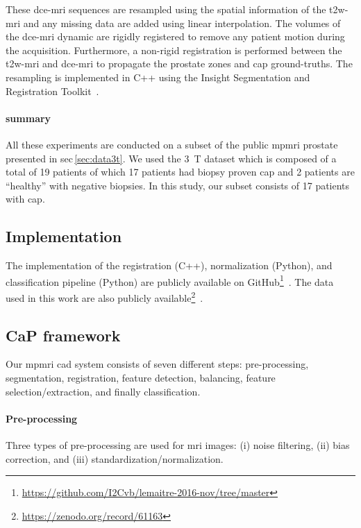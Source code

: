 \documentclass[num-refs]{wiley-article}
\begin{document}
These \ac{dce}-\ac{mri} sequences are resampled using the spatial
information of the \ac{t2w}-\ac{mri} and any missing data are added using linear interpolation.
The volumes of the \ac{dce}-\ac{mri} dynamic are rigidly registered to remove any patient motion during the acquisition.
Furthermore, a non-rigid registration is performed between the \ac{t2w}-\ac{mri} and \ac{dce}-\ac{mri} to propagate the prostate zones and \ac{cap} ground-truths.
The resampling is implemented in C++ using the Insight Segmentation and Registration Toolkit~\citep{ibanez2005itk}.
\paragraph{summary}
All these experiments are conducted on a subset of the public \ac{mpmri} prostate presented in \acs{sec}\,\ref{sec:data3t}.
We used the \SI{3}{\tesla} dataset which is composed of a total of 19 patients of which 17 patients had biopsy proven \ac{cap} and 2 patients are ``healthy'' with negative biopsies. 
In this study, our subset consists of 17 patients with \ac{cap}.

\subsection{Implementation}

The implementation of the registration (C++), normalization (Python), and classification pipeline (Python) are publicly available on GitHub\footnote{\url{https://github.com/I2Cvb/lemaitre-2016-nov/tree/master}}~\citep{lemaitre2016github}.
The data used in this work are also publicly available\footnote{\url{https://zenodo.org/record/61163}}~\citep{lemaitre2016dce}.

\subsection{CaP framework}
\label{sec:framework}



Our \ac{mpmri} \ac{cad} system consists of seven different steps: pre-processing, segmentation, registration, feature detection, balancing, feature selection/extraction, and finally classification.

\paragraph{Pre-processing}
Three types of pre-processing are used for \ac{mri} images: (i) noise filtering, (ii) bias correction, and (iii) standardization/normalization.
\end{document}
